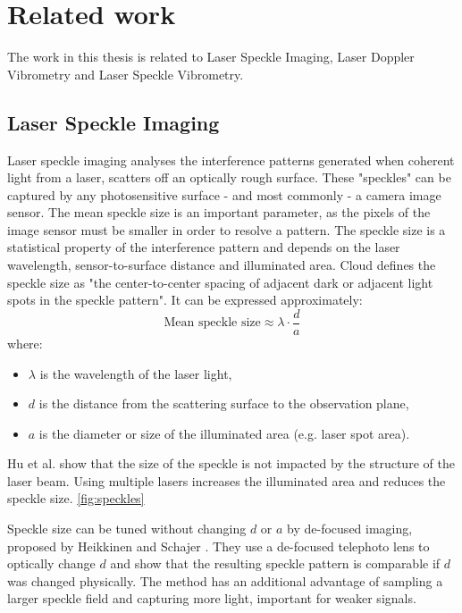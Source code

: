 \section{Related work}
\label{sec:related_work}

The work in this thesis is related to Laser Speckle Imaging, Laser Doppler Vibrometry and Laser Speckle Vibrometry.

\subsection{Laser Speckle Imaging}
Laser speckle imaging analyses the interference patterns generated when coherent light from a laser, scatters off an optically rough surface. These "speckles" can be captured by any photosensitive surface - and most commonly - a camera image sensor. 
The mean speckle size is an important parameter, as the pixels of the image sensor must be smaller in order to resolve a pattern. The speckle size is a statistical property of the interference pattern and depends on the laser wavelength, sensor-to-surface distance and illuminated area. Cloud \cite{specklesize} defines the speckle size as "the center-to-center spacing of adjacent dark or adjacent light spots in the speckle pattern". It can be expressed approximately:
\[
\text{Mean speckle size} \approx \lambda \cdot \frac{d}{a}
\]
where:
\begin{itemize}
    \item \(\lambda\) is the wavelength of the laser light,
    \item \(d\) is the distance from the scattering surface to the observation plane,
    \item \(a\) is the diameter or size of the illuminated area (e.g. laser spot area).
\end{itemize}

Hu et al. \cite{specklesizeANDstructure} show that the size of the speckle is not impacted by the structure of the laser beam. Using multiple lasers increases the illuminated area and reduces the speckle size. \ref{fig:speckles}

Speckle size can be tuned without changing $d$ or $a$ by de-focused imaging, proposed by Heikkinen and Schajer \cite{defocusedVSobjective}. They use a de-focused telephoto lens to optically change $d$ and show that the resulting speckle pattern is comparable if $d$ was changed physically. The method has an additional advantage of sampling a larger speckle field and capturing more light, important for weaker signals.


